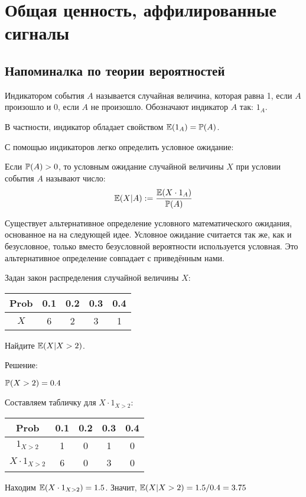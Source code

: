 \chapter{Общая ценность, аффилированные сигналы}


\section{Напоминалка по теории вероятностей}



\begin{mydef}
Индикатором события $ A $ называется случайная величина, которая равна 1, если $ A $ произошло и 0, если $ A $ не произошло. Обозначают индикатор $ A $ так: $ 1_{A} $.
\end{mydef}

В частности, индикатор обладает свойством $ \E(1_{A})=\P(A) $.

С помощью индикаторов легко определить условное ожидание:

\begin{mydef}
Если $ \P(A)>0 $, то условным ожидание случайной величины $ X $ при условии события $ A $ называют число:
\[ \E(X|A):=\frac{\E(X\cdot 1_{A})}{\P(A)} \]
\label{posit_condition}
\end{mydef}

Существует альтернативное определение условного математического ожидания, основанное на на следующей идее. Условное ожидание считается так же, как и безусловное, только вместо безусловной вероятности используется условная. Это альтернативное определение совпадает с приведённым нами.

\begin{myex} Задан закон распределения случайной величины $X$:


\begin{tabular}{c|cccc}
Prob & 0.1 & 0.2 & 0.3 & 0.4 \\
\hline
$X$ & 6 & 2 & 3 & 1 \\
\end{tabular}

Найдите $ \E(X|X>2) $.

Решение:

$\P(X>2)=0.4$

Составляем табличку для $ X\cdot 1_{X>2} $:

\begin{tabular}{c|cccc}
Prob & 0.1 & 0.2 & 0.3 & 0.4 \\
\hline
$1_{X>2}$ & 1 & 0 & 1 & 0 \\
$X\cdot 1_{X>2}$ & 6 & 0 & 3 & 0 \\
\end{tabular}

Находим $ \E(X\cdot 1_{X>2})=1.5 $. Значит, $ \E(X|X>2)=1.5/0.4=3.75 $

\end{myex}


